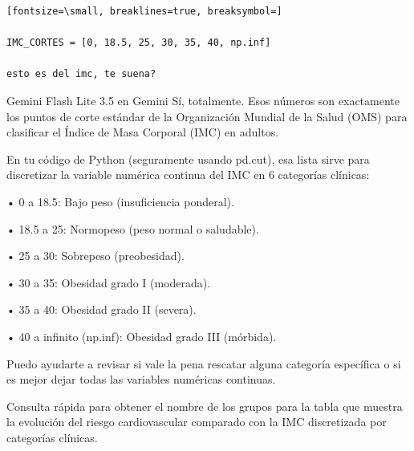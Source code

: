 \documentclass[12pt,a4paper,oneside]{book}
\begin{document}
\begin{iaprompt}
\begin{Verbatim}[fontsize=\small, breaklines=true, breaksymbol=]

IMC_CORTES = [0, 18.5, 25, 30, 35, 40, np.inf]

esto es del imc, te suena?
\end{Verbatim}
\end{iaprompt}
\begin{iaresp}{Gemini Flash Lite 3.5 en Gemini}
Sí, totalmente. Esos números son exactamente los puntos de corte estándar de la Organización Mundial de la Salud (OMS) para clasificar el Índice de Masa Corporal (IMC) en adultos.

En tu código de Python (seguramente usando pd.cut), esa lista sirve para discretizar la variable numérica continua del IMC en 6 categorías clínicas:

• 0 a 18.5: Bajo peso (insuficiencia ponderal).

• 18.5 a 25: Normopeso (peso normal o saludable).

• 25 a 30: Sobrepeso (preobesidad).

• 30 a 35: Obesidad grado I (moderada).

• 35 a 40: Obesidad grado II (severa).

• 40 a infinito (np.inf): Obesidad grado III (mórbida).

Puedo ayudarte a revisar si vale la pena rescatar alguna categoría específica o si es mejor dejar todas las variables numéricas continuas.

\end{iaresp}
\begin{iaanalisis}
Consulta rápida para obtener el nombre de los grupos para la tabla que muestra la evolución del riesgo cardiovascular comparado con la IMC discretizada por categorías clínicas.
\end{iaanalisis}
\end{document}
